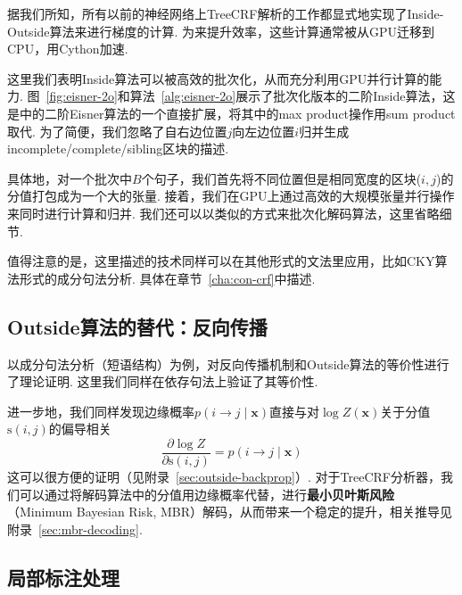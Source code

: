

据我们所知，所有以前的神经网络上TreeCRF解析的工作都显式地实现了Inside-Outside算法来进行梯度的计算\cite{zhang-etal-2019-empirical, jiang-etal-2018-supervised}.
为来提升效率，这些计算通常被从GPU迁移到CPU，用Cython加速.

这里我们表明Inside算法可以被高效的批次化，从而充分利用GPU并行计算的能力.
图~\ref{fig:eisner-2o}和算法~\ref{alg:eisner-2o}展示了批次化版本的二阶Inside算法，这是\cite{mcdonald-pereira-2006-online}中的二阶Eisner算法的一个直接扩展，将其中的max product操作用sum product取代.
为了简便，我们忽略了自右边位置$j$向左边位置$i$归并生成incomplete/complete/sibling区块的描述.

具体地，对一个批次中$B$个句子，我们首先将不同位置但是相同宽度的区块($i, j$)的分值打包成为一个大的张量.
接着，我们在GPU上通过高效的大规模张量并行操作来同时进行计算和归并.
我们还可以以类似的方式来批次化解码算法，这里省略细节.

值得注意的是，这里描述的技术同样可以在其他形式的文法里应用，比如CKY算法形式的成分句法分析\cite{finkel-etal-2008-efficient,drozdov-etal-2019-unsupervised-latent}.
具体在章节~\ref{cha:con-crf}中描述.

\subsection{Outside算法的替代：反向传播}

\cite{eisner-2016-inside}以成分句法分析（短语结构）为例，对反向传播机制和Outside算法的等价性进行了理论证明.
这里我们同样在依存句法上验证了其等价性.

进一步地，我们同样发现边缘概率$p(i \rightarrow j\mid\boldsymbol{x})$直接与对$\log Z(\boldsymbol{x})$关于分值$\mathrm{s}(i,j)$的偏导相关
\begin{equation}
    \label{eq:partial-derivative}
    \frac{\partial \log Z}{\partial \mathrm{s}(i, j)} = p(i \rightarrow j\mid\boldsymbol{x})
\end{equation}
这可以很方便的证明（见附录~\ref{sec:outside-backprop}）.
对于TreeCRF分析器，我们可以通过将解码算法中的分值用边缘概率代替，进行\textbf{最小贝叶斯风险}（Minimum Bayesian Risk, MBR）解码\cite{smith-smith-2007-probabilistic}，从而带来一个稳定的提升，相关推导见附录~\ref{sec:mbr-decoding}.

\subsection{局部标注处理}
\label{sub@sec:partial-annotation}

